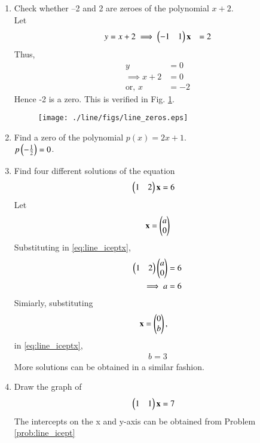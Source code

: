 \renewcommand{\theequation}{\theenumi}
\begin{enumerate}[label=\arabic*.,ref=\thesubsection.\theenumi]
%
\item Check whether –2 and 2 are zeroes of the polynomial $x + 2.$
\\
\solution Let 
%
\begin{align}
y &= x + 2
\implies \begin{pmatrix}-1 & 1\end{pmatrix}\mathbf{x} &= 2
\end{align}
%
Thus, 
%
\begin{align}
y &= 0 
\\
\implies  x + 2 &=0
\\
\text{or, } x &= -2
\end{align}
%
Hence -2 is a zero. This is verified in Fig. \ref{fig:line_zeros}.
%
\begin{figure}[!ht]
\texttt{[image: ./line/figs/line\_zeros.eps]}
\caption{}
\label{fig:line_zeros}
\end{figure}
%
\item Find a zero of the polynomial $p(x) = 2x + 1$.
\\
\solution $p\left(-\frac{1}{2}\right) = 0$.
%
%
\item Find four different solutions of the equation 
\label{prob:line_icept}
%
\begin{align}
\label{eq:line_iceptx}
\begin{pmatrix}1 & 2\end{pmatrix}\mathbf{x} &= 6
\end{align}
%
\solution Let 
%
\begin{align}
\mathbf{x} = \begin{pmatrix}a\\0\end{pmatrix}
\end{align}
%
Substituting in \eqref{eq:line_iceptx}, 
%
\begin{align}
\begin{pmatrix}1 & 2\end{pmatrix} \begin{pmatrix}a\\0\end{pmatrix}&= 6
\\
\implies a &=6
\end{align}
%
Simiarly, substituting 
%
\begin{align}
\mathbf{x} &= \begin{pmatrix}0\\b\end{pmatrix},
\end{align}
%
in \eqref{eq:line_iceptx}, 
%
%
\begin{align}
b =3
\end{align}
%
More solutions can be obtained in a similar fashion.
%
\item Draw the graph of 
%
\begin{align}
\begin{pmatrix}1 & 1\end{pmatrix}\mathbf{x} &= 7
\end{align}
%
\solution The intercepts on the x and y-axis can be obtained from Problem \ref{prob:line_icept}

\end{enumerate}
